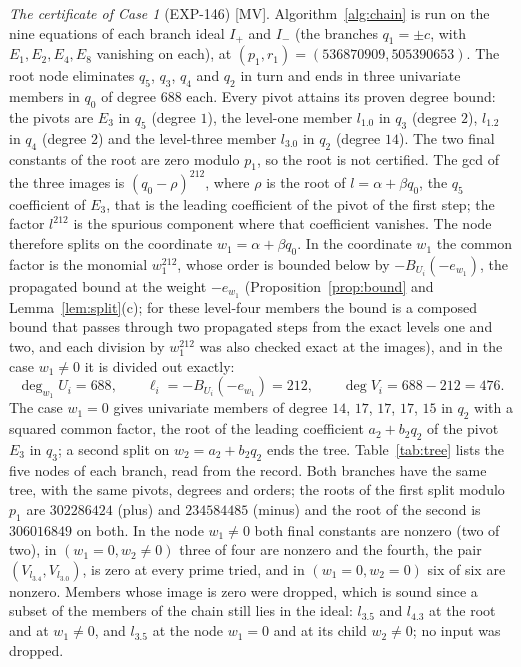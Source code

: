 \documentclass[11pt]{article}
\theoremstyle{remark}
\begin{document}
\emph{The certificate of Case 1} (EXP-146) [MV]. Algorithm~\ref{alg:chain} is run on the nine equations of each branch ideal $I_+$ and $I_-$ (the branches $q_1=\pm c$, with $E_1,E_2,E_4,E_8$ vanishing on each), at $(p_1,r_1)=(536870909,505390653)$. The root node eliminates $q_5$, $q_3$, $q_4$ and $q_2$ in turn
and ends in three univariate members in $q_0$ of degree $688$ each. Every pivot attains its proven degree bound: the pivots are $E_3$ in $q_5$ (degree $1$), the level-one member $l_{1.0}$ in $q_3$ (degree $2$), $l_{1.2}$ in $q_4$ (degree $2$) and the level-three member $l_{3.0}$ in $q_2$ (degree $14$).
The two final constants of the root are zero modulo $p_1$, so the root is not certified. The gcd of the three images is $(q_0-\rho)^{212}$, where $\rho$ is the root of $l=\alpha+\beta q_0$, the $q_5$ coefficient of $E_3$, that is the leading coefficient of the pivot of the first step; the factor $l^{212}$ is the spurious component where that coefficient vanishes.
The node therefore splits on the coordinate $w_1=\alpha+\beta q_0$. In the coordinate $w_1$ the common factor is the monomial $w_1^{212}$, whose order is bounded below by $-B_{U_i}(-e_{w_1})$, the propagated bound at the weight $-e_{w_1}$ (Proposition~\ref{prop:bound} and Lemma~\ref{lem:split}(c); for these level-four members the bound is a composed bound that passes through two propagated steps from the exact levels one and two, and each division by $w_1^{212}$ was also checked exact at the images), and in the case $w_1\ne0$ it is divided out exactly:
\begin{equation}\label{eq:t-nz}
\deg_{w_1}U_i=688,\qquad \ell_i=-B_{U_i}(-e_{w_1})=212,\qquad \deg V_i=688-212=476 .
\end{equation}
The case $w_1=0$ gives univariate members of degree $14$, $17$, $17$, $17$, $15$ in $q_2$ with a squared common factor, the root of the leading coefficient $a_2+b_2q_2$ of the pivot $E_3$ in $q_3$; a second split on $w_2=a_2+b_2q_2$ ends the tree. Table~\ref{tab:tree} lists the five nodes of each branch, read from the record.
Both branches have the same tree, with the same pivots, degrees and orders; the roots of the first split modulo $p_1$ are $302286424$ (plus) and $234584485$ (minus) and the root of the second is $306016849$ on both. In the node $w_1\ne0$ both final constants are nonzero (two of two), in $(w_1=0,w_2\ne0)$ three of four are nonzero
and the fourth, the pair $(V_{l_{3.4}},V_{l_{3.0}})$, is zero at every prime tried, and in $(w_1=0,w_2=0)$ six of six are nonzero. Members whose image is zero were dropped, which is sound since a subset of the members of the chain still lies in the ideal: $l_{3.5}$ and $l_{4.3}$ at the root and at $w_1\ne0$, and $l_{3.5}$ at the node $w_1=0$ and at its child $w_2\ne0$; no input was dropped.
\end{document}
